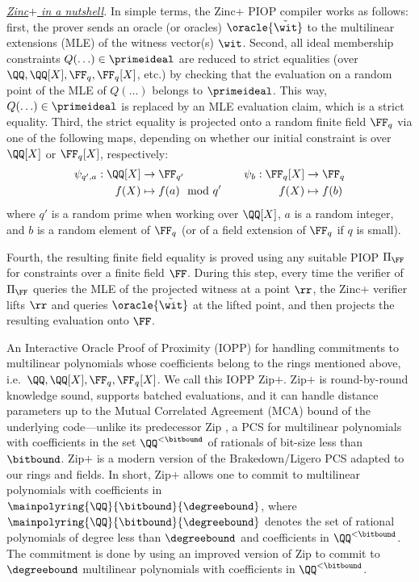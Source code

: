     \medskip

    \noindent\emph{\underline{Zinc$+$ in a nutshell}.} 
    In simple terms, the Zinc+ PIOP compiler works as follows: first, the prover sends an oracle (or oracles) $\oracle{\tilde{\wit}}$ to the multilinear extensions (MLE) of the witness vector(s) $\wit$. Second, all ideal membership constraints $Q(\ldots)\in \primeideal$ are reduced to strict equalities (over $\QQ, \QQ[X], \FF_q, \FF_q[X]$, etc.)  by checking that the evaluation on a random point of the MLE of $Q(\ldots)$ belongs to $\primeideal$. This way,  $Q(\ldots)\in \primeideal$ is replaced by an MLE evaluation claim, which is a strict equality. Third, the strict equality is projected onto a random finite field $\FF_q$ via one of the following maps, depending on whether our initial constraint is over $\QQ[X]$ or $\FF_q[X]$, respectively: 
    \begin{equation}
\begin{aligned}\psi_{q',a}: \QQ[X] &\to \FF_{q'} \\ f(X) &\mapsto f(a) \mod q' \end{aligned} \qquad \begin{aligned} \psi_{b}: \FF_q[X] &\to \FF_q \\ f(X) &\mapsto f(b) \end{aligned} 
    \end{equation}
    where $q'$ is a random prime when working over $\QQ[X]$, $a$ is a random integer, and  $b$ is a random element of $\FF_q$ (or of a field extension of $\FF_q$ if $q$ is small). 


    Fourth, the resulting finite field equality is proved using any suitable PIOP $\Pi_{\FF}$ for constraints over a finite field $\FF$. During this step, every time the verifier of $\Pi_{\FF}$ queries the MLE of the projected witness at a point $\rr$, the Zinc+ verifier lifts $\rr$ and queries  $\oracle{\tilde{\wit}}$ at the lifted point, and then projects the resulting evaluation onto $\FF$. 

 An Interactive Oracle Proof of Proximity (IOPP) for handling commitments to multilinear polynomials whose coefficients belong to the rings mentioned above, i.e.\ $\QQ, \QQ[X],\FF_q, \FF_q[X]$. %
    We call this IOPP Zip$+$. Zip$+$ is round-by-round knowledge sound, supports batched evaluations, and it can handle distance parameters up to the Mutual Correlated Agreement (MCA) bound of the underlying code---unlike its predecessor Zip \cite{Zinc}, a PCS for multilinear polynomials with coefficients in the set $\QQ^{<\bitbound}$ of rationals of bit-size less than $\bitbound$. Zip$+$ is a modern version of the Brakedown/Ligero PCS \cite{C:GLSTW23,CCS:AHIV17} adapted to our rings and fields. 
    In short, Zip$+$ allows one to commit to multilinear polynomials with coefficients in $\mainpolyring{\QQ}{\bitbound}{\degreebound}$, where $\mainpolyring{\QQ}{\bitbound}{\degreebound}$ denotes the set of rational polynomials of degree less than $\degreebound$ and coefficients in $\QQ^{<\bitbound}$. The commitment is done by using an improved version of Zip to commit to $\degreebound$ multilinear polynomials with coefficients in $\QQ^{<\bitbound}$. 
    
